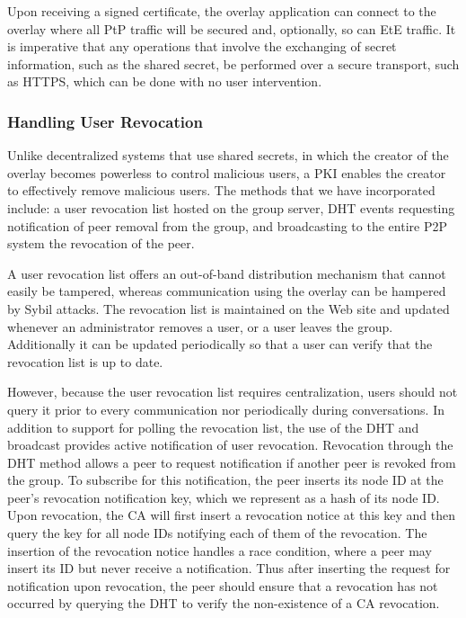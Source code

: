 \documentclass[conference]{IEEEtran}
\begin{document}
Upon receiving a signed certificate, the overlay application can connect to the
overlay where all PtP traffic will be secured and, optionally, so can EtE
traffic.  It is imperative that any operations that involve the exchanging of
secret information, such as the shared secret, be performed over a secure
transport, such as HTTPS, which can be done with no user intervention.

\subsubsection{Handling User Revocation}
Unlike decentralized systems that use shared secrets, in which the creator of
the overlay becomes powerless to control malicious users, a PKI enables the
creator to effectively remove malicious users.  The methods that we have
incorporated include:  a user revocation list hosted on the group server,
DHT events requesting notification of peer removal from the group, and
broadcasting to the entire P2P system the revocation of the peer.

A user revocation list offers an out-of-band distribution mechanism that cannot
easily be tampered, whereas communication using the overlay can be hampered
by Sybil attacks.  The revocation list is maintained on the Web site and updated
whenever an administrator removes a user, or a user leaves the group.
Additionally it can be updated periodically so that a user can verify that the revocation
list is up to date.

However, because the user revocation list requires centralization, users should
not query it prior to every communication nor periodically during conversations.
In addition to support for polling the revocation list, the use of the DHT and broadcast provides active notification of
user revocation.  Revocation through the DHT method allows a peer to request
notification if another peer is revoked from the group.  To subscribe for this
notification, the peer inserts its node ID at the peer's revocation
notification key, which we represent as a hash of its node ID.  Upon revocation,
the CA will first insert a revocation notice at this key and then query the
key for all node IDs notifying each of them of the revocation.  The insertion
of the revocation notice handles a race condition, where a peer may insert
its ID but never receive a notification.  Thus after inserting the request for
notification upon revocation, the peer should ensure that a revocation has not
occurred by querying the DHT to verify the non-existence of a CA revocation.
\end{document}

